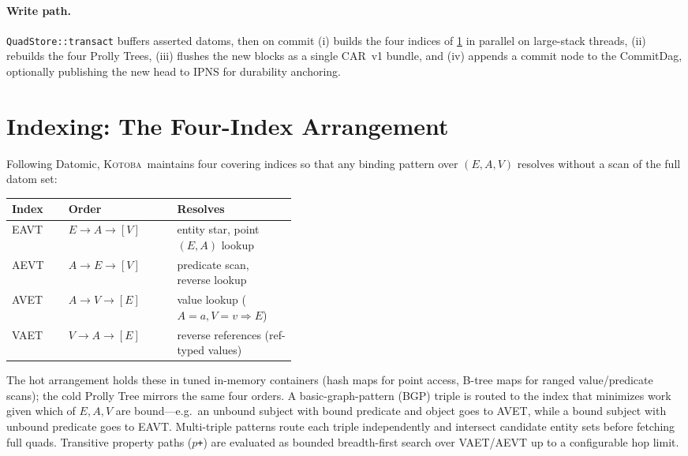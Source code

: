 \documentclass[11pt]{article}
\newcommand{\kotoba}{\textsc{Kotoba}}
\begin{document}
\paragraph{Write path.}
\texttt{QuadStore::transact} buffers asserted datoms, then on commit (i) builds
the four indices of \cref{sec:index} in parallel on large-stack threads,
(ii) rebuilds the four Prolly Trees, (iii) flushes the new blocks as a single
CAR~v1 bundle, and (iv) appends a commit node to the CommitDag, optionally
publishing the new head to IPNS for durability anchoring.

\section{Indexing: The Four-Index Arrangement}
\label{sec:index}

Following Datomic, \kotoba\ maintains four covering indices so that any binding
pattern over $(E,A,V)$ resolves without a scan of the full datom set:
%
\begin{center}
\small
\begin{tabular}{@{}llp{0.42\linewidth}@{}}
\toprule
\textbf{Index} & \textbf{Order} & \textbf{Resolves} \\
\midrule
EAVT & $E\to A\to [V]$ & entity star, point $(E,A)$ lookup \\
AEVT & $A\to E\to [V]$ & predicate scan, reverse lookup \\
AVET & $A\to V\to [E]$ & value lookup ($A{=}a, V{=}v \Rightarrow E$) \\
VAET & $V\to A\to [E]$ & reverse references (ref-typed values) \\
\bottomrule
\end{tabular}
\end{center}
%
The hot arrangement holds these in tuned in-memory containers (hash maps for
point access, B-tree maps for ranged value/predicate scans); the cold Prolly Tree
mirrors the same four orders. A basic-graph-pattern (BGP) triple is routed to the
index that minimizes work given which of $E,A,V$ are bound---e.g.\ an unbound
subject with bound predicate and object goes to AVET, while a bound subject with
unbound predicate goes to EAVT. Multi-triple patterns route each triple
independently and intersect candidate entity sets before fetching full quads.
Transitive property paths (\texttt{$p$+}) are evaluated as bounded breadth-first
search over VAET/AEVT up to a configurable hop limit.
\end{document}
